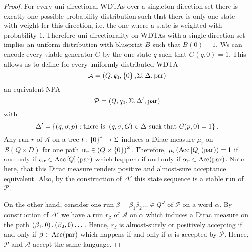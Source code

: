 \begin{proof}
  For every uni-directional \acp{WDTA} over a singleton direction set
  there is excatly one possible probability distribution such that there is
  only one state with weight for this direction, i.e. the one where a state is
  weighted with probability $1$. Therefore uni-directionality on \acp{WDTA}
  with a single direction set implies an uniform distribution with blueprint
  $B$ such that $B(0) = 1$. We can encode every viable generator $G$ by the one
  state $q$ such that $G(q,0) = 1$. This allows us to define for every
  uniformly distributed \ac{WDTA}
  \begin{equation*}
    \mathcal{A} = \left(Q, q_{0}, \left\{0\right\}, \Sigma, \Delta, \operatorname{par}\right)
  \end{equation*}
  an equivalent \ac{NPA}
  \begin{equation*}
    \mathcal{P} = \left(Q, q_{0}, \Sigma, \Delta', \operatorname{par}\right)
  \end{equation*}
  with
  \begin{equation*}
    \Delta' = \left\{
      \left(q,\sigma,p\right): \text{there is }\left(q,\sigma,G\right)\in\Delta
        \text{ such that }G(p,0) = 1
    \right\}.
  \end{equation*}
  Any run $r$ of $\mathcal{A}$ on a tree $t:\left\{0\right\}^{*}\rightarrow\Sigma$ 
  induces a Dirac measure $\mu_{r}$ on $\mathcal{B}(Q\times D)$ for one path 
  $\alpha_{r}\in\left(Q\times \left\{0\right\}\right)^{\omega}$.
  Therefore, $\mu_{r}(\operatorname{Acc}\left[Q\right](\operatorname{par})) = 1$ if and only if
  $\alpha_{r}\in\operatorname{Acc}\left[Q\right](\operatorname{par})$ which happens if and only if 
  $\alpha_{r}\in\operatorname{Acc}(\operatorname{par})$. Note here, that this Dirac measure renders
  positive and almost-sure acceptance equivalent. Also, by the construction of
  $\Delta'$ this state sequence is a viable run of $\mathcal{P}$. 
  
  On the other hand, consider one run
  $\beta = \beta_{1}\beta_{2}\dots\in Q^{\omega}$ of $\mathcal{P}$ on
  a word $\alpha$. By construction of $\Delta'$ we have a run $r_{\beta}$ of
  $\mathcal{A}$ on $\alpha$ which induces a Dirac measure on the path
  $\left(\beta_{1}, 0\right), \left(\beta_{2}, 0\right)\dots$. Hence, $r_{\beta}$ is
  almost-surely or positively accepting if and only if $\beta\in\operatorname{Acc}(\operatorname{par})$
  which happens if and only if $\alpha$ is accepted by $\mathcal{P}$.
  Hence, $\mathcal{P}$ and $\mathcal{A}$ accept the same language.


\end{proof}
